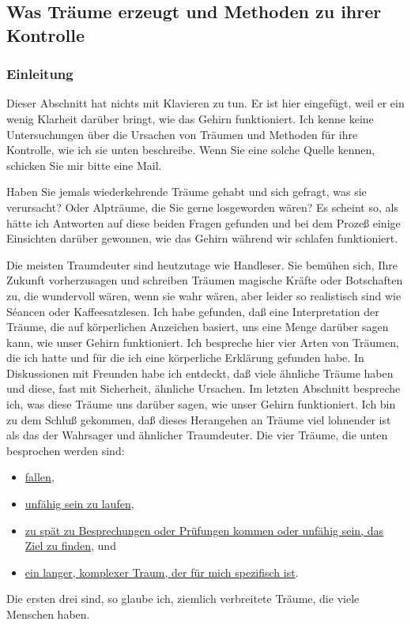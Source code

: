 
\subsection{Was Träume erzeugt und Methoden zu ihrer Kontrolle}
\label{c3_5}

\subsubsection{Einleitung}
\label{c3_5a}

Dieser Abschnitt hat nichts mit Klavieren zu tun.
Er ist hier eingefügt, weil er ein wenig Klarheit darüber bringt, wie das Gehirn funktioniert.
Ich kenne keine Untersuchungen über die Ursachen von Träumen und Methoden für ihre Kontrolle, wie ich sie unten beschreibe.
Wenn Sie eine solche Quelle kennen, schicken Sie mir bitte eine Mail.

Haben Sie jemals wiederkehrende Träume gehabt und sich gefragt, was sie verursacht?
Oder Alpträume, die Sie gerne losgeworden wären?
Es scheint so, als hätte ich Antworten auf diese beiden Fragen gefunden und bei dem Prozeß einige Einsichten darüber gewonnen, wie das Gehirn während wir schlafen funktioniert.

Die meisten Traumdeuter sind heutzutage wie Handleser.
Sie bemühen sich, Ihre Zukunft vorherzusagen und schreiben Träumen magische Kräfte oder Botschaften zu, die wundervoll wären, wenn sie wahr wären, aber leider so realistisch sind wie Séancen oder Kaffeesatzlesen.
Ich habe gefunden, daß eine Interpretation der Träume, die auf körperlichen Anzeichen basiert, uns eine Menge darüber sagen kann, wie unser Gehirn funktioniert.
Ich bespreche hier vier Arten von Träumen, die ich hatte und für die ich eine körperliche Erklärung gefunden habe.
In Diskussionen mit Freunden habe ich entdeckt, daß viele ähnliche Träume haben und diese, fast mit Sicherheit, ähnliche Ursachen.
Im letzten Abschnitt bespreche ich, was diese Träume uns darüber sagen, wie unser Gehirn funktioniert.
Ich bin zu dem Schluß gekommen, daß dieses Herangehen an Träume viel lohnender ist als das der Wahrsager und ähnlicher Traumdeuter.
Die vier Träume, die unten besprochen werden sind:

\begin{itemize} 
 \item \hyperref[c3_5b]{fallen},
 \item \hyperref[c3_5c]{unfähig sein zu laufen},
 \item \hyperref[c3_5d]{zu spät zu Besprechungen oder Prüfungen kommen oder unfähig sein, das Ziel zu finden}, und
 \item \hyperref[c3_5e]{ein langer, komplexer Traum, der für mich spezifisch ist}.
 \end{itemize}
Die ersten drei sind, so glaube ich, ziemlich verbreitete Träume, die viele Menschen haben.
 

